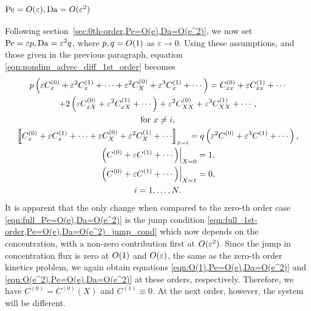 \subsubsection{\(\mathrm{Pe} = O(\varepsilon), \mathrm{Da} = O(\varepsilon^2)\)}
Following section~\ref{sec:0th-order,Pe=O(e),Da=O(e^2)}, we now set \(\mathrm{Pe} =
\varepsilon p, \mathrm{Da} = \varepsilon^2 q\), where \(p, q = O(1)\) as \(\varepsilon
\to 0\). Using these assumptions, and those given in the previous paragraph,
equation \eqref{eqn:nondim_advec_diff_1st_order} becomes
\begin{subequations}
    \label{eqn:full_1st-order,Pe=O(e),Da=O(e^2)}
    \begin{gather}
        \label{eqn:full_1st-order,Pe=O(e),Da=O(e^2)_eq}
        \begin{gathered}
            p \left(
            \varepsilon C^{(0)}_x + \varepsilon^2 C^{(1)}_x + \dotsb +
            \varepsilon^2 C^{(0)}_X + \varepsilon^3 C^{(1)}_x + \dotsb \right) =
            C^{(0)}_{xx} + \varepsilon C^{(1)}_{xx} + \dotsb\\
            + 2\left(\varepsilon C^{(0)}_{xX} + \varepsilon^2 C^{(1)}_{xX} +
            \dotsb \right) +
            \varepsilon^2 C^{(0)}_{XX} + \varepsilon^3 C^{(1)}_{XX} + \dotsb,
        \end{gathered}\\
        \nonumber \text{for } x \ne i,\\
        \label{eqn:full_1st-order,Pe=O(e),Da=O(e^2)_jump_cond}
        \jump{C^{(0)}_x + \varepsilon C^{(1)}_x + \dotsb + \varepsilon C^{(0)}_X
        + \varepsilon^2 C^{(1)}_X + \dotsb}_{x=i} = q\left(\varepsilon^2 C^{(0)}
        + \varepsilon^3 C^{(1)} + \dotsb\right),\\
        \left.\left(C^{(0)} + \varepsilon C^{(1)} + \dotsb\right)\right|_{X=0}
        = 1,\\
        \left.\left(C^{(0)} + \varepsilon C^{(1)} + \dotsb\right)\right|_{X=1}
        = 0,\\
        \nonumber i = 1, \dotsc, N.
    \end{gather}
\end{subequations}
It is apparent that the only change when compared to the zero-th order case
\eqref{eqn:full_Pe=O(e),Da=O(e^2)} is the jump condition
\eqref{eqn:full_1st-order,Pe=O(e),Da=O(e^2)_jump_cond} which now depends on the
concentration, with a non-zero contribution first at \(O(\varepsilon^2)\).
Since the jump in concentration flux is zero at \(O(1)\) and
\(O(\varepsilon)\), the same as the zero-th order kinetics problem, we again
obtain equations \eqref{eqn:O(1),Pe=O(e),Da=O(e^2)} and
\eqref{eqn:O(e^2),Pe=O(e),Da=O(e^2)} at these orders, respectively. Therefore,
we have \(C^{(0)} = C^{(0)}(X)\) and \(C^{(1)} \equiv 0\). At the next order,
however, the system will be different.

